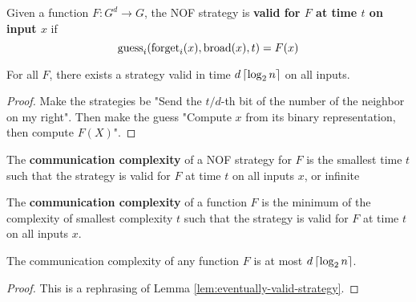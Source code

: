 \begin{definition}
  \label{def:valid-strategy}

  Given a function $F : G^d \to G$, the NOF strategy is {\bf valid for $F$ at time $t$ on input $x$} if
  $$\operatorname{guess}_i(\operatorname{forget}_i(x), \operatorname{broad}(x), t) = F(x)$$
\end{definition}

\begin{lemma}
  \label{lem:eventually-valid-strategy}

  For all $F$, there exists a strategy valid in time $d\left\lceil \log_2 n\right\rceil$ on all inputs.
\end{lemma}
\begin{proof}

  Make the strategies be "Send the $t / d$-th bit of the number of the neighbor on my right". Then make the guess "Compute $x$ from its binary representation, then compute $F(X)$".
\end{proof}

\begin{definition}
  \label{def:strategy-complexity}

  The {\bf communication complexity} of a NOF strategy for $F$ is the smallest time $t$ such that the strategy is valid for $F$ at time $t$ on all inputs $x$, or infinite
\end{definition}

\begin{definition}
  \label{def:strategy-complexity}

  The {\bf communication complexity} of a function $F$ is the minimum of the complexity of smallest complexity $t$ such that the strategy is valid for $F$ at time $t$ on all inputs $x$.
\end{definition}

\begin{lemma}
  \label{lem:trivial-bound-complexity}

  The communication complexity of any function $F$ is at most $d\left\lceil \log_2 n\right\rceil$.
\end{lemma}
\begin{proof}

  This is a rephrasing of Lemma \ref{lem:eventually-valid-strategy}.
\end{proof}
